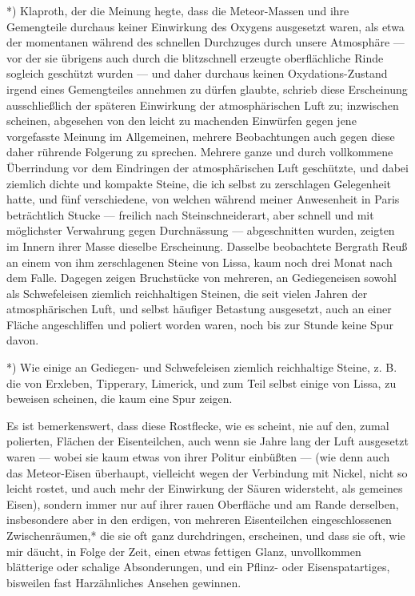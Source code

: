 \documentclass[a4paper, 11pt, oneside, german]{article}
\begin{document}
*) Klaproth, der die Meinung hegte, dass die Meteor-Massen und ihre Gemengteile durchaus keiner Einwirkung des Oxygens ausgesetzt waren, als etwa der momentanen während des schnellen Durchzuges durch unsere Atmosphäre --- vor der sie übrigens auch durch die blitzschnell erzeugte oberflächliche Rinde sogleich geschützt wurden --- und daher durchaus keinen Oxydations-Zustand irgend eines Gemengteiles annehmen zu dürfen glaubte, schrieb diese Erscheinung ausschließlich der späteren Einwirkung der atmosphärischen Luft zu; inzwischen scheinen, abgesehen von den leicht zu machenden Einwürfen gegen jene vorgefasste Meinung im Allgemeinen, mehrere Beobachtungen auch gegen diese daher rührende Folgerung zu sprechen. Mehrere ganze und durch vollkommene Überrindung vor dem Eindringen der atmosphärischen Luft geschützte, und dabei ziemlich dichte und kompakte Steine, die ich selbst zu zerschlagen Gelegenheit hatte, und fünf verschiedene, von welchen während meiner Anwesenheit in Paris beträchtlich Stucke --- freilich nach Steinschneiderart, aber schnell und mit möglichster Verwahrung gegen Durchnässung --- abgeschnitten wurden, zeigten im Innern ihrer Masse dieselbe Erscheinung. Dasselbe beobachtete Bergrath Reuß an einem von ihm zerschlagenen Steine von Lissa, kaum noch drei Monat nach dem Falle. Dagegen zeigen Bruchstücke von mehreren, an Gediegeneisen sowohl als Schwefeleisen ziemlich reichhaltigen Steinen, die seit vielen Jahren der atmosphärischen Luft, und selbst häufiger Betastung ausgesetzt, auch an einer Fläche angeschliffen und poliert worden waren, noch bis zur Stunde keine Spur davon.

*) Wie einige an Gediegen- und Schwefeleisen ziemlich reichhaltige Steine, z. B. die von Erxleben, Tipperary, Limerick, und zum Teil selbst einige von Lissa, zu beweisen scheinen, die kaum eine Spur zeigen.

Es ist bemerkenswert, dass diese Rostflecke, wie es scheint, nie auf den, zumal polierten, Flächen der Eisenteilchen, auch wenn sie Jahre lang der Luft ausgesetzt waren --- wobei sie kaum etwas von ihrer Politur einbüßten --- (wie denn auch das Meteor-Eisen überhaupt, vielleicht wegen der Verbindung mit Nickel, nicht so leicht rostet, und auch mehr der Einwirkung der Säuren widersteht, als gemeines Eisen), sondern immer nur auf ihrer rauen Oberfläche und am Rande derselben, insbesondere aber in den erdigen, von mehreren Eisenteilchen eingeschlossenen Zwischenräumen,* die sie oft ganz durchdringen, erscheinen, und dass sie oft, wie mir däucht, in Folge der Zeit, einen etwas fettigen Glanz, unvollkommen blätterige oder schalige Absonderungen, und ein Pflinz- oder Eisenspatartiges, bisweilen fast Harzähnliches Ansehen gewinnen.
\end{document}
